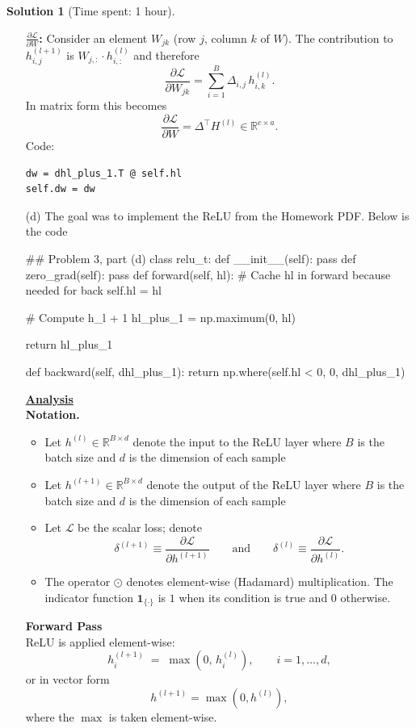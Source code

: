 \documentclass[11pt, reqno, letterpaper, twoside]{amsart}
\theoremstyle{plain}
\theoremstyle{definition}
\newtheorem{solution}[theorem]{Solution}
\begin{document}
\begin{solution}[Time spent: 1 hour]
\begin{enumerate}
\textbf{$\frac{\partial\mathcal{L}}{\partial W}$: }
Consider an element $W_{jk}$ (row $j$, column $k$ of $W$). The contribution to $h^{(l+1)}_{i,j}$ is $W_{j,:}\cdot h^{(l)}_{i,:}$ and therefore
\[
\frac{\partial \mathcal{L}}{\partial W_{jk}} = \sum_{i=1}^{B} \Delta_{i,j}\, h^{(l)}_{i,k}.
\]
In matrix form this becomes
\[
\frac{\partial\mathcal{L}}{\partial W} = \Delta^\top H^{(l)} \in\mathbb{R}^{c\times a}.
\]
Code:
\begin{verbatim}
dw = dhl_plus_1.T @ self.hl
self.dw = dw
\end{verbatim}

\item[(d)] The goal was to implement the ReLU from the Homework PDF. Below is the code
\begin{python}
    ## Problem 3, part (d)
class relu_t:
    def __init__(self):
        pass
    def zero_grad(self):
        pass
    def forward(self, hl):
        # Cache hl in forward because needed for back
        self.hl = hl

        # Compute h_{l + 1}
        hl_plus_1 = np.maximum(0, hl)

        return hl_plus_1
    
    def backward(self, dhl_plus_1):
        return np.where(self.hl < 0, 0, dhl_plus_1)
\end{python}

\noindent \textbf{\underline{Analysis}} \\
\textbf{Notation.}
\begin{itemize}
  \item Let $h^{(l)}\in\mathbb{R}^{B \times d}$ denote the input to the ReLU layer where $B$ is the batch size and $d$ is the dimension of each sample
  \item Let $h^{(l+1)}\in\mathbb{R}^{B \times d}$ denote the output of the ReLU layer where $B$ is the batch size and $d$ is the dimension of each sample
  \item Let $\mathcal{L}$ be the scalar loss; denote
    \[
      \delta^{(l+1)} \equiv \frac{\partial \mathcal{L}}{\partial h^{(l+1)}}
      \qquad\text{and}\qquad
      \delta^{(l)} \equiv \frac{\partial \mathcal{L}}{\partial h^{(l)}}.
    \]
  \item The operator $\odot$ denotes element-wise (Hadamard) multiplication. The indicator function $\mathbf{1}_{\{\cdot\}}$ is $1$ when its condition is true and $0$ otherwise. \\
\end{itemize}

\noindent \textbf{Forward Pass} \\
ReLU is applied element-wise:
\[
  h^{(l+1)}_i \;=\; \max(0,\, h^{(l)}_i), \qquad i=1,\dots,d,
\]
or in vector form
\[
  h^{(l+1)} = \max(0, h^{(l)}),
\]
where the $\max$ is taken element-wise.


\end{enumerate}
\end{solution}
\end{document}
